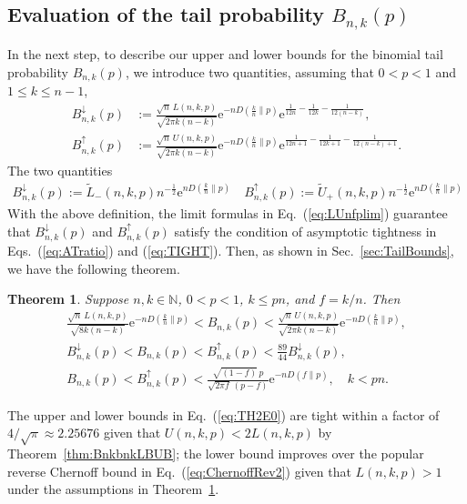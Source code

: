 \documentclass[aop]{imsart}
\theoremstyle{plain}
\newtheorem{theorem}{Theorem}[section]
\theoremstyle{remark}
\newcommand{\rme}{\mathrm{e}}
\newcommand{\bbN}{\mathbb{N}}
\newcommand{\1}{\operatorname{\uppercase\expandafter{\romannumeral1}}}
\newcommand{\2}{\operatorname{\uppercase\expandafter{\romannumeral2}}}
\newcommand{\3}{\operatorname{\uppercase\expandafter{\romannumeral3}}}
\newcommand{\4}{\operatorname{\uppercase\expandafter{\romannumeral4}}}
\newcommand{\5}{\operatorname{\uppercase\expandafter{\romannumeral5}}}
\newcommand{\6}{\operatorname{\uppercase\expandafter{\romannumeral6}}}
\newcommand{\7}{\operatorname{\uppercase\expandafter{\romannumeral7}}}
\newcommand{\8}{\operatorname{\uppercase\expandafter{\romannumeral8}}}
\newcommand{\9}{\operatorname{\uppercase\expandafter{\romannumeral9}}}
\newcommand{\eref}[1]{Eq.~\textup{(\ref{#1})}}
\newcommand{\eqsref}[2]{Eqs.~(\ref{#1}) and (\ref{#2})}
\newcommand{\thref}[1]{Theorem~\ref{#1}}
\newcommand{\sref}[1]{Sec.~\ref{#1}}
\begin{document}
\subsection{Evaluation of the tail probability $B_{n,k}(p)$}
In the next step, 
to describe our upper and lower bounds for the binomial tail probability 
$B_{n,k}(p)$,  we introduce two quantities, assuming that $0<p<1$ and $1\leq k\leq n-1$,
\begin{equation}\label{eq:BnkpArrow}
\begin{aligned} 
B_{n,k}^{\downarrow}(p) &:=\frac{\sqrt{n}\,L(n,k,p)}{ \sqrt{2\pi k(n-k)}}
\rme^{-n D(\frac{k}{n}\| p )}\rme^{\frac{1}{12n}-\frac{1}{12k}-\frac{1}{12(n-k)}} ,\\
B_{n,k}^{\uparrow}(p)&:=\frac{\sqrt{n}\,U(n,k,p)}{ \sqrt{2\pi k(n-k)}}\rme^{-n D(\frac{k}{n}\| p )}\rme^{\frac{1}{12n+1}-\frac{1}{12k+1}-\frac{1}{12(n-k)+1}}.
\end{aligned}
\end{equation}
The two quantities
\begin{align} 
B_{n,k}^{\downarrow}(p):= \tilde{L}_-(n,k,p)n^{-\frac{1}{2}}\rme^{n D(\frac{k}{n}\| p )} 
\quad
B_{n,k}^{\uparrow}(p):= \tilde{U}_+(n,k,p)n^{-\frac{1}{2}}\rme^{n D(\frac{k}{n}\| p )}
\end{align}
\fi
With the above definition,
the limit formulas in \eref{eq:LUnfplim} guarantee that
 $B_{n,k}^{\downarrow}(p)$
and $B_{n,k}^{\uparrow}(p)$
satisfy the condition of asymptotic tightness in \eqsref{eq:ATratio}{eq:TIGHT}.
Then, as shown in  \sref{sec:TailBounds}, we have the following theorem.
\begin{theorem}\label{TH2}
Suppose  $n,k\in \bbN$, $0<p<1$,  $k\leq p n$, and $f=k/n$. Then 
\begin{gather}
\frac{\sqrt{n}\,L(n,k,p)}{\sqrt{8k(n-k)}}\rme^{-nD(\frac{k}{n}\| p)}<
B_{n,k}(p)< \frac{\sqrt{n}\, U(n,k,p)}{\sqrt{2\pi k(n-k)}}
\rme^{-nD(\frac{k}{n}\| p)}, \label{eq:TH2E0}\\
B_{n,k}^{\downarrow}(p)< B_{n,k}(p)< B_{n,k}^{\uparrow}(p)<\frac{89}{44} 
B_{n,k}^{\downarrow}(p),\label{eq:TH2E1}\\
B_{n,k}(p)< B_{n,k}^{\uparrow}(p)< \frac{\sqrt{(1-f)}\,p}{\sqrt{2\pi f} \,(p -f) }\rme^{-nD (f\|p)}, \quad k<pn. \label{eq:TH2E2}
\end{gather}
\end{theorem}
The upper and lower bounds in \eref{eq:TH2E0}   are tight within a factor of $4/\sqrt{\pi}\approx 2.25676$ given that $U(n,k,p)<2L(n,k,p)$ by \thref{thm:BnkbnkLBUB}; the lower bound  improves over the popular reverse Chernoff bound in \eref{eq:ChernoffRev2} given that $L(n,k,p)>1$ under the assumptions in \thref{TH2}.
\end{document}
